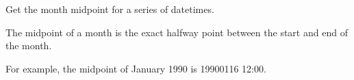 \documentclass[letterpaper,10pt,english]{sphinxmanual}
\begin{document}

\begin{fulllineitems}
\label{\detokenize{misc:glomar_gridding.utils.get_month_midpoint}}
\pysigstartsignatures
\pysiglinewithargsret
{}
{}
{}
\pysigstopsignatures
\sphinxAtStartPar
Get the month midpoint for a series of datetimes.

\sphinxAtStartPar
The midpoint of a month is the exact half\sphinxhyphen{}way point between the start and
end of the month.

\sphinxAtStartPar
For example, the midpoint of January 1990 is 1990\sphinxhyphen{}01\sphinxhyphen{}16 12:00.
\begin{quote}\begin{description}
\sphinxAtStartPar
{}

\end{description}\end{quote}

\end{fulllineitems}

\end{document}
